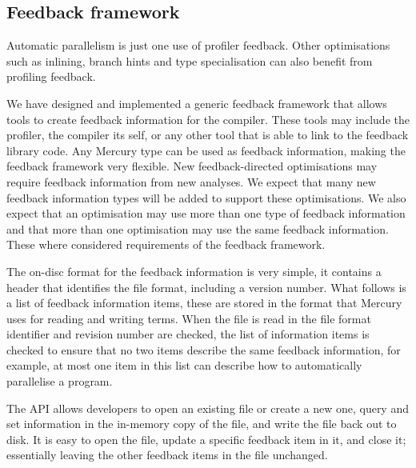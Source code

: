 \subsection{Feedback framework}
\label{sec:feedback}

Automatic parallelism is just one use of profiler feedback.
Other optimisations
such as inlining,
branch hints
and type specialisation
can also benefit from profiling feedback.

We have designed and implemented a generic feedback framework that allows
tools to create feedback information for the compiler.
These tools may include the profiler, the compiler its self,
or any other tool that is able to link to the feedback library code.
Any Mercury type can be used as feedback information,
making the feedback framework very flexible.
New feedback-directed optimisations may require feedback information
from new analyses.
We expect that many new feedback information types will be added to
support these optimisations.
We also expect that an optimisation may use more than one type of
feedback information and that more than one optimisation may use the
same feedback information.
These where considered requirements of the feedback framework.

The on-disc format for the feedback information is very simple,
it contains a header that identifies the file format,
including a version number.
What follows is a list of feedback information items,
these are stored in the format that Mercury uses for reading and writing
terms.
When the file is read in the file format identifier and revision
number are checked,
the list of information items is checked to ensure that no two items
describe the same feedback information,
for example,
at most one item in this list can describe how to automatically parallelise
a program.

The API allows developers to open an existing file or create a new one,
query and set information in the in-memory copy of the file,
and write the file back out to disk.
It is easy to open the file,
update a specific feedback item in it,
and close it;
essentially leaving the other feedback items in the file unchanged.



